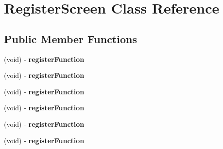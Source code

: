 \hypertarget{interface_register_screen}{
\section{\-Register\-Screen \-Class \-Reference}
\label{interface_register_screen}
}
\subsection*{\-Public \-Member \-Functions}
\begin{DoxyCompactItemize}
\item 
\hypertarget{interface_register_screen_a4d9d7e3542050c87486eb8b1e899b006}{
(void) -\/ {\bfseries register\-Function}}
\label{interface_register_screen_a4d9d7e3542050c87486eb8b1e899b006}

\item 
\hypertarget{interface_register_screen_a4d9d7e3542050c87486eb8b1e899b006}{
(void) -\/ {\bfseries register\-Function}}
\label{interface_register_screen_a4d9d7e3542050c87486eb8b1e899b006}

\item 
\hypertarget{interface_register_screen_a4d9d7e3542050c87486eb8b1e899b006}{
(void) -\/ {\bfseries register\-Function}}
\label{interface_register_screen_a4d9d7e3542050c87486eb8b1e899b006}

\item 
\hypertarget{interface_register_screen_a4d9d7e3542050c87486eb8b1e899b006}{
(void) -\/ {\bfseries register\-Function}}
\label{interface_register_screen_a4d9d7e3542050c87486eb8b1e899b006}

\item 
\hypertarget{interface_register_screen_a4d9d7e3542050c87486eb8b1e899b006}{
(void) -\/ {\bfseries register\-Function}}
\label{interface_register_screen_a4d9d7e3542050c87486eb8b1e899b006}

\item 
\hypertarget{interface_register_screen_a4d9d7e3542050c87486eb8b1e899b006}{
(void) -\/ {\bfseries register\-Function}}
\label{interface_register_screen_a4d9d7e3542050c87486eb8b1e899b006}

\end{DoxyCompactItemize}
